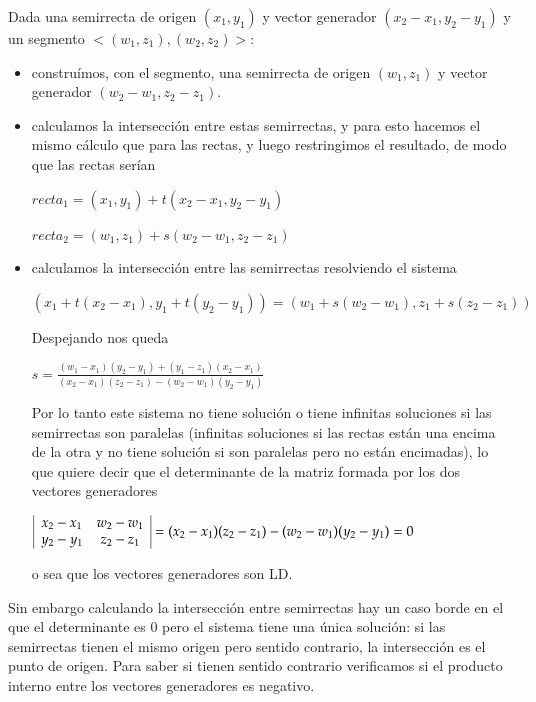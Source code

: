 Dada una semirrecta de origen $(x_1, y_1)$ y vector generador $(x_2 - x_1, y_2 - y_1)$ y un
segmento $<(w_1, z_1), (w_2, z_2)>$:
\begin{itemize}
\item construímos, con el segmento, una semirrecta de origen $(w_1, z_1)$ y vector generador
$(w_2 - w_1, z_2 - z_1)$.
\item calculamos la intersección entre estas semirrectas, y para esto hacemos el mismo cálculo que
para las rectas, y luego restringimos el resultado, de modo que las rectas serían

\vspace{0.2cm}
$recta_1 = (x_1, y_1) + t(x_2 - x_1, y_2 - y_1)$

\vspace{0.1cm}
$recta_2 = (w_1, z_1) + s(w_2 - w_1, z_2 - z_1)$
\vspace{0.2cm}

\item calculamos la intersección entre las semirrectas resolviendo el sistema 

\vspace{0.2cm}
\begin{center}$(x_1 + t(x_2 - x_1), y_1 + t(y_2 - y_1)) = (w_1 + s(w_2 - w_1), z_1 + s(z_2 - z_1))$\end{center}
\vspace{0.2cm}

Despejando nos queda

\vspace{0.2cm}
\begin{center}
$s = \displaystyle\frac{(w_1 - x_1)(y_2 - y_1) + (y_1 - z_1)(x_2 - x_1)}
                       {(x_2 - x_1)(z_2 - z_1) - (w_2 - w_1)(y_2 - y_1)}$
\end{center}
\vspace{0.2cm}

Por lo tanto este sistema no tiene solución o tiene infinitas soluciones si las semirrectas son
paralelas (infinitas soluciones si las rectas están una encima de la otra y no tiene solución si
son paralelas pero no están encimadas), lo que quiere decir que el determinante de la matriz
formada por los dos vectores generadores

\vspace{0.2cm}
\begin{center}
$\vline
\begin{array}{cc}
x_2 - x_1 & w_2 - w_1 \\
y_2 - y_1 & z_2 - z_1 \\
\end{array}\vline
= (x_2 - x_1)(z_2 - z_1) - (w_2 - w_1)(y_2 - y_1) = 0$
\end{center}
\vspace{0.2cm}

o sea que los vectores generadores son LD.
\end{itemize}
Sin embargo calculando la intersección entre semirrectas hay un caso borde en el que el
determinante es $0$ pero el sistema tiene una única solución: si las semirrectas tienen el mismo
origen pero sentido contrario, la intersección es el punto de origen. Para saber si tienen sentido
contrario verificamos si el producto interno entre los vectores generadores es negativo.


